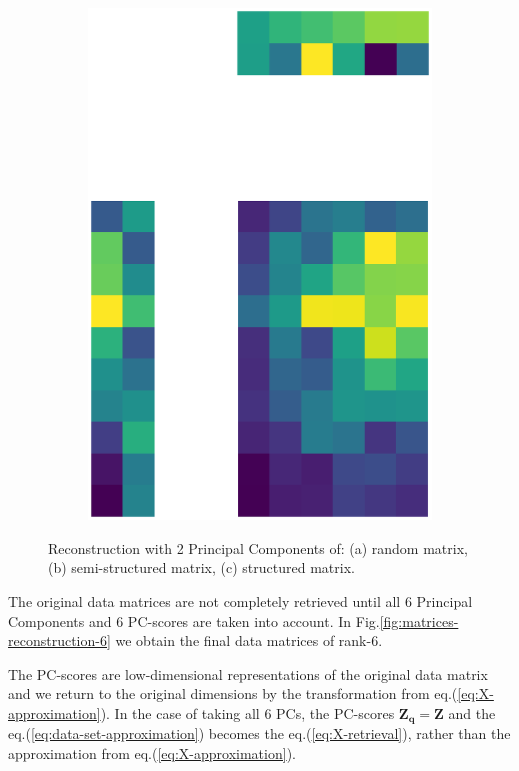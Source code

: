 \documentclass[10pt,twocolumn]{article}
\begin{document}
\begin{figure}[H]
\begin{subfigure}[t]{.15\textwidth}
\includegraphics[scale=.2]{DWGs/structured-matrix-reconstruction-PCs-2.eps}
\caption{ }
\end{subfigure}
\caption{Reconstruction with 2 Principal Components of: (a) random matrix, (b) semi-structured matrix, (c) structured matrix.}
\label{fig:matrices-reconstruction-2}
\end{figure}

The original data matrices are not completely retrieved until all 6 Principal Components and 6 PC-scores are taken into account. In Fig.\ref{fig:matrices-reconstruction-6} we obtain the final data matrices of rank-6.

The PC-scores are low-dimensional representations of the original data matrix and we return to the original dimensions by the transformation from eq.(\ref{eq:X-approximation}). In the case of taking all 6 PCs, the PC-scores $\bm{Z_q} = \bm{Z}$ and the eq.(\ref{eq:data-set-approximation}) becomes the eq.(\ref{eq:X-retrieval}), rather than the approximation from eq.(\ref{eq:X-approximation}).
\end{document}
